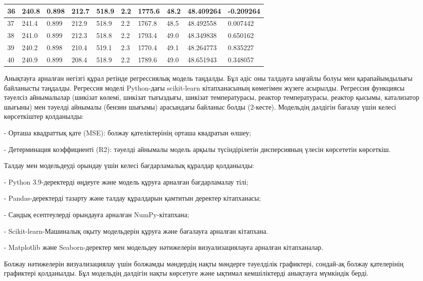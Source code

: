 \begin{longtable}[c]{|l|l|l|l|l|l|l|l|l|l|}
36 & 240.8 & 0.898 & 212.7 & 518.9 & 2.2  & 1775.6  & 48.2 & 48.409264 & -0.209264 \\ \hline
37 & 241.4 & 0.899 & 212.9 & 518.9 & 2.2  & 1767.8  & 48.5 & 48.492558 & 0.007442  \\ \hline
38 & 241.0 & 0.899 & 212.3 & 518.8 & 2.2  & 1793.4  & 49.0 & 48.349838 & 0.650162  \\ \hline
39 & 240.2 & 0.898 & 210.4 & 519.1 & 2.3  & 1770.4  & 49.1 & 48.264773 & 0.835227  \\ \hline
40 & 240.9 & 0.899 & 208.4 & 518.9 & 2.2  & 1789.6  & 49.0 & 48.651943 & 0.348057  \\ \hline
\end{longtable}

\begin{multicols}{2}
Анықтауға арналған негізгі құрал ретінде регрессиялық модель таңдалды.
Бұл әдіс оны талдауға ыңғайлы болуы мен қарапайымдылығы байланысты
таңдалды. Регрессия моделі Python-дағы scikit-learn кітапханасының
көмегімен жүзеге асырылды. Регрессия функциясы тәуелсіз айнымалылар
(шикізат көлемі, шикізат тығыздығы, шикізат температурасы, реактор
температурасы, реактор қысымы, катализатор шығыны) мен тәуелді айнымалы
(бензин шығымы) арасындағы байланыс болды (2-кесте). Модельдің дәлдігін
бағалау үшін келесі көрсеткіштер қолданылды:

- Орташа квадраттық қате (MSE): болжау қателіктерінің орташа квадратын
өлшеу;

- Детерминация коэффициенті (R2): тәуелді айнымалы модель арқылы
түсіндірілетін дисперсияның үлесін көрсететін көрсеткіш.

Талдау мен модельдеуді орындау үшін келесі бағдарламалық құралдар
қолданылды:

- Python 3.9-деректерді өңдеуге және модель құруға арналған
бағдарламалау тілі;

- Pandas-деректерді тазарту және талдау құралдарын қамтитын деректер
кітапханасы;

- Сандық есептеулерді орындауға арналған NumPy-кітапхана;

- Scikit-learn-Машиналық оқыту модельдерін құруға және бағалауға
арналған кітапхана.

- Matplotlib және Seaborn-деректер мен модельдеу нәтижелерін
визуализациялауға арналған кітапханалар.

Болжау нәтижелерін визуализациялау үшін болжамды мәндердің нақты
мәндерге тәуелділік графиктері, сондай-ақ болжау қателерінің графиктері
қолданылды. Бұл модельдің дәлдігін нақты көрсетуге және ықтимал
кемшіліктерді анықтауға мүмкіндік берді.


\end{multicols}
